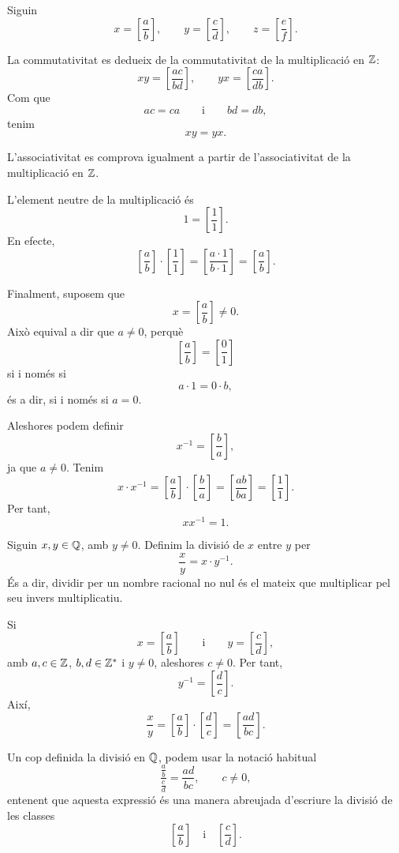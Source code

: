 \begin{prova}
Siguin
\[
	x=\left[\frac{a}{b}\right],
	\qquad
	y=\left[\frac{c}{d}\right],
	\qquad
	z=\left[\frac{e}{f}\right].
\]

La commutativitat es dedueix de la commutativitat de la multiplicació en \(\mathbb{Z}\):
\[
	xy
	=
	\left[\frac{ac}{bd}\right],
	\qquad
	yx
	=
	\left[\frac{ca}{db}\right].
\]
Com que
\[
	ac=ca
	\qquad\text{i}\qquad
	bd=db,
\]
tenim
\[
	xy=yx.
\]

L'associativitat es comprova igualment a partir de l'associativitat de la multiplicació en \(\mathbb{Z}\).

L'element neutre de la multiplicació és
\[
	1=\left[\frac{1}{1}\right].
\]
En efecte,
\[
	\left[\frac{a}{b}\right]
	\cdot
	\left[\frac{1}{1}\right]
	=
	\left[\frac{a\cdot1}{b\cdot1}\right]
	=
	\left[\frac{a}{b}\right].
\]

Finalment, suposem que
\[
	x=\left[\frac{a}{b}\right]\neq0.
\]
Això equival a dir que \(a\neq0\), perquè
\[
	\left[\frac{a}{b}\right]
	=
	\left[\frac{0}{1}\right]
\]
si i només si
\[
	a\cdot1=0\cdot b,
\]
és a dir, si i només si \(a=0\).

Aleshores podem definir
\[
	x^{-1}
	=
	\left[\frac{b}{a}\right],
\]
ja que \(a\neq0\). Tenim
\[
	x\cdot x^{-1}
	=
	\left[\frac{a}{b}\right]
	\cdot
	\left[\frac{b}{a}\right]
	=
	\left[\frac{ab}{ba}\right]
	=
	\left[\frac{1}{1}\right].
\]
Per tant,
\[
	xx^{-1}=1.
\]
\end{prova}

\begin{definicio}
Siguin \(x,y\in\mathbb{Q}\), amb \(y\neq0\). Definim la divisió de \(x\) entre \(y\) per
\[
	\frac{x}{y}=x\cdot y^{-1}.
\]
És a dir, dividir per un nombre racional no nul és el mateix que multiplicar pel seu invers multiplicatiu.
\end{definicio}

Si
\[
	x=\left[\frac{a}{b}\right]
	\qquad\text{i}\qquad
	y=\left[\frac{c}{d}\right],
\]
amb \(a,c\in\mathbb{Z}\), \(b,d\in\mathbb{Z}^{*}\) i \(y\neq0\), aleshores \(c\neq0\). Per tant,
\[
	y^{-1}
	=
	\left[\frac{d}{c}\right].
\]
Així,
\[
	\frac{x}{y}
	=
	\left[\frac{a}{b}\right]
	\cdot
	\left[\frac{d}{c}\right]
	=
	\left[\frac{ad}{bc}\right].
\]

Un cop definida la divisió en \(\mathbb{Q}\), podem usar la notació habitual
\[
	\frac{\frac{a}{b}}{\frac{c}{d}}
	=
	\frac{ad}{bc},
	\qquad c\neq0,
\]
entenent que aquesta expressió és una manera abreujada d'escriure la divisió de les classes
\[
	\left[\frac{a}{b}\right]
	\quad\text{i}\quad
	\left[\frac{c}{d}\right].
\]


